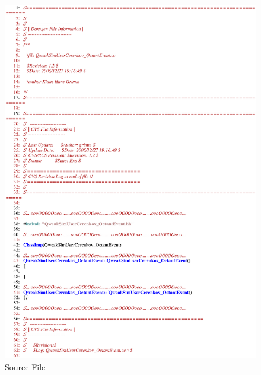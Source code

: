 \begin{figure}[ht]
  \hspace{0cm}
  \includegraphics[scale=0.8]{./figures5/QweakSimUserCerenkov_OctantEvent.cc-p1.eps}
  \caption{\label{SourceV30} Source File}
           \label{fig:V-SC-33}
\end{figure}

\clearpage

